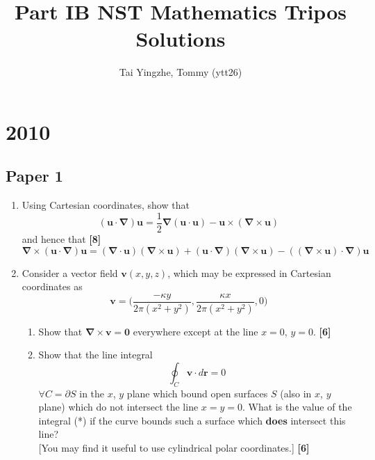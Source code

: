 \documentclass[a4paper]{article}
\title{\textbf{Part IB NST Mathematics Tripos Solutions}}
\author{Tai Yingzhe, Tommy (ytt26)}
\date{}
\begin{document}
\maketitle
\tableofcontents
\newpage

\section{2010}
\subsection{Paper 1}
\begin{qns}\leavevmode
\begin{enumerate}[label=(\alph*)]
    \item Using Cartesian coordinates, show that
$$(\mathbf{u}\cdot\boldsymbol{\nabla})\mathbf{u}=\frac{1}{2}\boldsymbol{\nabla}(\mathbf{u}\cdot\mathbf{u})-\mathbf{u}\times(\boldsymbol{\nabla}\times\mathbf{u})$$
and hence that \hfill
\textbf{[8]}
$$\boldsymbol{\nabla}\times(\mathbf{u}\cdot\boldsymbol{\nabla})\mathbf{u}=(\boldsymbol{\nabla}\cdot\mathbf{u})(\boldsymbol{\nabla}\times\mathbf{u})+(\mathbf{u}\cdot\boldsymbol{\nabla})(\boldsymbol{\nabla}\times\mathbf{u})-((\boldsymbol{\nabla}\times\mathbf{u})\cdot\boldsymbol{\nabla})\mathbf{u}$$
\item  Consider a vector field $\mathbf{v}(x,y,z)$, which may be expressed in Cartesian coordinates as 
$$\mathbf{v}=\bigg(\frac{-\kappa y}{2\pi(x^2+y^2)},\frac{\kappa x}{2\pi(x^2+y^2)},0\bigg)$$
\begin{enumerate}[label=(\roman*)]
    \item Show that $\boldsymbol{\nabla}\times\mathbf{v}=\boldsymbol{0}$ everywhere except at the line $x=0$, $y=0$.\hfill
\textbf{[6]}
\item Show that the line integral
\begin{equation}
\oint_C\mathbf{v}\cdot d\mathbf{r}=0\tag{*}
\end{equation}
$\forall C=\partial S$ in the $x$, $y$ plane which bound open surfaces $S$ (also in $x$, $y$ plane) which do not intersect the line $x=y=0$. What is the value of the integral (*) if the curve bounds such a surface which \textbf{does} intersect this line?\\[5pt]
[You may find it useful to use cylindrical polar coordinates.]
\hfill
\textbf{[6]}
\end{enumerate}
\end{enumerate}
\end{qns}
\end{document}
